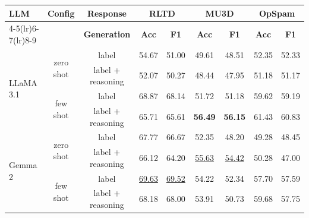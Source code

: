 \begin{table}[ht]
\centering
\small
\begin{tabular}{l c c cc cc cc}
\toprule
\textbf{LLM} & \textbf{Config} & \textbf{Response}
  & \multicolumn{2}{c}{\textbf{RLTD}}
  & \multicolumn{2}{c}{\textbf{MU3D}}
  & \multicolumn{2}{c}{\textbf{OpSpam}} \\
\cmidrule(lr){4-5}\cmidrule(lr){6-7}\cmidrule(lr){8-9}
 & & \textbf{Generation} & \textbf{Acc} & \textbf{F1}
     & \textbf{Acc} & \textbf{F1}
     & \textbf{Acc} & \textbf{F1} \\
\midrule

\multirow{4}{*}{LLaMA 3.1} 
 & \multirow{2}{*}{zero shot} 
   & label 
     &  54.67 & 51.00
     &  49.61 & 48.51
     &  52.35 & 52.33 \\
 & 
   & label + reasoning 
     & 52.07 & 50.27 
     & 48.44 & 47.95 
     & 51.18 & 51.17 \\
\cmidrule(lr){2-9}
 & \multirow{2}{*}{few shot}
   & label
     & 68.87 & 68.14 
     & 51.72 & 51.18 
     & 59.62 & 59.19 \\
 &
   & label + reasoning
     & 65.71 & 65.61
     & \textbf{56.49} & \textbf{56.15} 
     & 61.43 & 60.83 \\
\midrule

\multirow{4}{*}{Gemma 2} 
 & \multirow{2}{*}{zero shot} 
   & label 
     & 67.77 & 66.67
     & 52.35 & 48.20 
     & 49.28 & 48.45 \\
 & 
   & label + reasoning
     & 66.12 & 64.20
     & \underline{55.63} & \underline{54.42}
     & 50.28 & 47.00 \\
\cmidrule(lr){2-9}
 & \multirow{2}{*}{few shot}
   & label
     & \underline{69.63} & \underline{69.52} 
     & 54.22 & 52.34 
     & 57.70 & 57.59 \\
 &
   & label + reasoning
     & 68.18 & 68.00 
     & 53.91 & 50.73
     & 59.68 & 57.75 \\
\midrule


\end{tabular}
\end{table}
